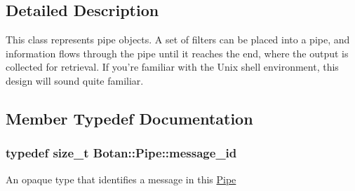 \subsection{Detailed Description}
This class represents pipe objects. A set of filters can be placed into a pipe, and information flows through the pipe until it reaches the end, where the output is collected for retrieval. If you're familiar with the Unix shell environment, this design will sound quite familiar. 

\subsection{Member Typedef Documentation}
\hypertarget{classBotan_1_1Pipe_a122c19120c1c21f270b6b6225ca9883c}{
\subsubsection[{message\-\_\-id}]{\setlength{\rightskip}{0pt plus 5cm}typedef size\-\_\-t {\bf Botan\-::\-Pipe\-::message\-\_\-id}}}\label{classBotan_1_1Pipe_a122c19120c1c21f270b6b6225ca9883c}
An opaque type that identifies a message in this \hyperlink{classBotan_1_1Pipe}{Pipe} 

